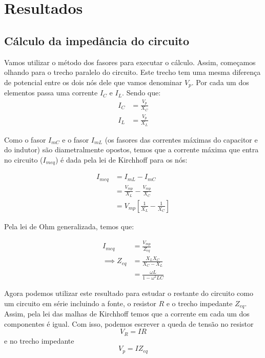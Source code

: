 \section{Resultados}

\subsection{Cálculo da impedância do circuito}

Vamos utilizar o método dos fasores para executar o cálculo. Assim, começamos olhando para o trecho paralelo do circuito. Este trecho tem uma mesma diferença de potencial entre os dois nós dele que vamos denominar \(V_{p}\). Por cada um dos elementos passa uma corrente \(I_{C}\) e \(I_{L}\). Sendo que:
\begin{align*}
    I_{C} &= \frac{V_{p}}{X_{C}} \\
    I_{L} &= \frac{V_{p}}{X_{L}} 
\end{align*}

Como o fasor \(I_{mC}\) e o fasor \(I_{mL}\) (os fasores das correntes máximas do capacitor e do indutor) são diametralmente opostos, temos que a corrente máxima que entra no circuito (\(I_{meq}\)) é dada pela lei de Kirchhoff para os nós:

\begin{align*}
    I_{m eq} &= I_{mL} - I_{mC} \\
           &= \frac{V_{mp}}{X_{L}} - \frac{V_{mp}}{X_{C}}\\
           &= V_{mp} \left[ \frac{1}{X_{L}} - \frac{1}{X_{C}}  \right]
\end{align*}

Pela lei de Ohm generalizada, temos que:

\begin{align*}
    I_{meq} &= \frac{V_{mp}}{Z_{eq}} \\
    \implies Z_{eq} &= \frac{X_{L} X_{C}}{X_{C} - X_{L}} \\
                    &= \frac{\omega L}{1 - \omega^{2}LC } 
\end{align*}

Agora podemos utilizar este resultado para estudar o restante do circuito como um circuito em série incluindo a fonte, o resistor \(R\) e o trecho impedante \(Z_{eq}\). Assim, pela lei das malhas de Kirchhoff temos que a corrente em cada um dos componentes é igual. Com isso, podemos escrever a queda de tensão no resistor
\[
    V_{R} = IR
\]
e no trecho impedante
\[
    V_{p} = I Z_{eq}
\]

